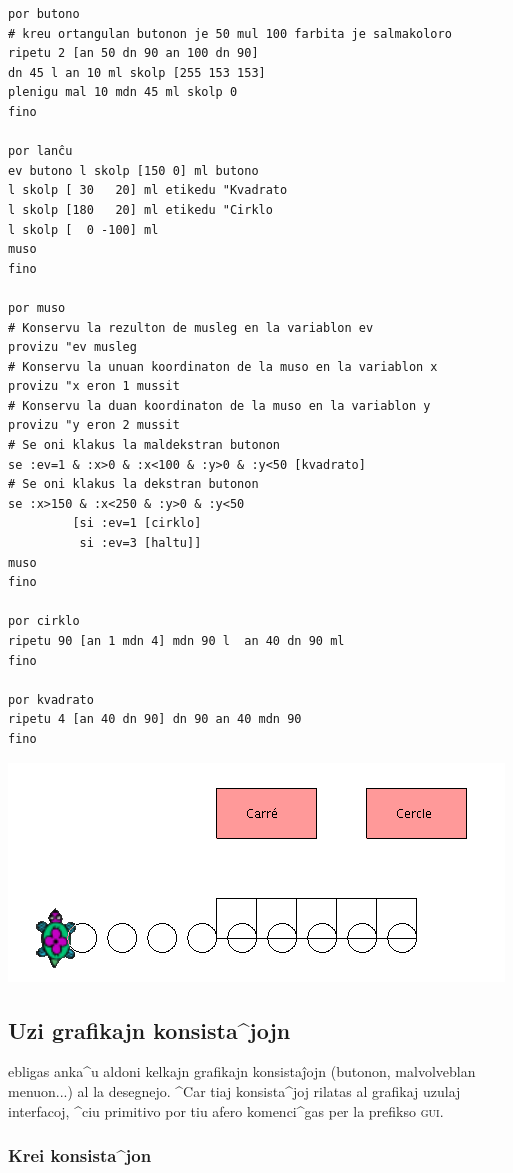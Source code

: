 \begin{verbatim}
por butono
# kreu ortangulan butonon je 50 mul 100 farbita je salmakoloro
ripetu 2 [an 50 dn 90 an 100 dn 90] 
dn 45 l an 10 ml skolp [255 153 153]
plenigu mal 10 mdn 45 ml skolp 0
fino

por lanĉu
ev butono l skolp [150 0] ml butono
l skolp [ 30   20] ml etikedu "Kvadrato
l skolp [180   20] ml etikedu "Cirklo
l skolp [  0 -100] ml
muso
fino

por muso
# Konservu la rezulton de musleg en la variablon ev
provizu "ev musleg
# Konservu la unuan koordinaton de la muso en la variablon x
provizu "x eron 1 mussit
# Konservu la duan koordinaton de la muso en la variablon y
provizu "y eron 2 mussit
# Se oni klakus la maldekstran butonon
se :ev=1 & :x>0 & :x<100 & :y>0 & :y<50 [kvadrato]
# Se oni klakus la dekstran butonon 
se :x>150 & :x<250 & :y>0 & :y<50 
         [si :ev=1 [cirklo]
          si :ev=3 [haltu]]
muso
fino

por cirklo
ripetu 90 [an 1 mdn 4] mdn 90 l  an 40 dn 90 ml
fino

por kvadrato
ripetu 4 [an 40 dn 90] dn 90 an 40 mdn 90
fino
\end{verbatim} 

\includegraphics*[width=15 cm]{bildoj/lissouris.png}

\subsection{Uzi grafikajn konsista^jojn}

\xlogo{} ebligas anka^u aldoni kelkajn grafikajn konsistaĵojn
(butonon, malvolveblan menuon...) al la desegnejo.  ^Car tiaj
konsista^joj rilatas al grafikaj uzulaj interfacoj, ^ciu primitivo por
tiu afero komenci^gas per la prefikso \og\textsc{gui}\fg.

\subsubsection{Krei konsista^jon}

